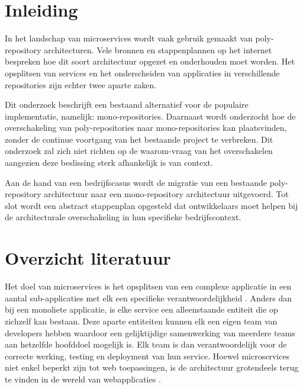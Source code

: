 \documentclass{hogent-article}
\affiliation{
  \textsuperscript{1} \href{mailto:liam.goethals@student.hogent.be}{liam.goethals@student.hogent.be}}
\begin{document}
\flushbottom %
\maketitle %
\tableofcontents %
\thispagestyle{empty} %


\section{Inleiding}

In het landschap van microservices wordt vaak gebruik gemaakt van poly-repository architecturen. Vele bronnen en stappenplannen op het internet bespreken hoe dit soort architectuur opgezet en onderhouden moet worden. Het opsplitsen van services en het onderscheiden van applicaties in verschillende repositories zijn echter twee aparte zaken.

Dit onderzoek beschrijft een bestaand alternatief voor de populaire implementatie, namelijk: mono-repositories. Daarnaast wordt onderzocht hoe de overschakeling van poly-repositories naar mono-repositories kan plaatsvinden, zonder de continue voortgang van het bestaande project te verbreken. 
Dit onderzoek zal zich niet richten op de waarom-vraag van het overschakelen aangezien deze beslissing sterk afhankelijk is van context. 

Aan de hand van een bedrijfscasus wordt de migratie van een bestaande poly-repository architectuur naar een mono-repository architectuur uitgevoerd. Tot slot wordt een abstract stappenplan opgesteld dat ontwikkelaars moet helpen bij de architecturale overschakeling in hun specifieke bedrijfscontext.

\section{Overzicht literatuur}
Het doel van microservices is het opsplitsen van een complexe applicatie in een aantal sub-applicaties met elk een specifieke verantwoordelijkheid \autocite{Thoenes2015}. Anders dan bij een monoliete applicatie, is elke service een alleenstaande entiteit die op zichzelf kan bestaan. Deze aparte entiteiten kunnen elk een eigen team van developers hebben waardoor een gelijktijdige samenwerking van meerdere teams aan hetzelfde hoofddoel mogelijk is. Elk team is dan verantwoordelijk voor de correcte werking, testing en deployment van hun service.
Hoewel microservices niet enkel beperkt zijn tot web toepassingen, is de architectuur grotendeels terug te vinden in de wereld van webapplicaties \autocite{Richardson2019}.
\end{document}
